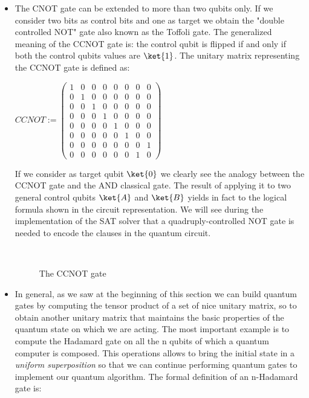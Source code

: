 \documentclass[english]{article}
\begin{document}
\begin{itemize}
				\item The CNOT gate can be extended to more than two qubits only. If we consider two bits as control bits and one as target we obtain the "double controlled NOT" gate also known as the Toffoli gate. The generalized meaning of the CCNOT gate is: the control qubit is flipped if and only if both the control qubits values are $\ket{1}$. The unitary matrix representing the CCNOT gate is defined as:
				
				\begin{center}
					$
					CCNOT :=
					\begin{pmatrix}
						1 & 0 & 0 & 0 & 0 & 0 & 0 & 0\\
						0 & 1 & 0 & 0 & 0 & 0 & 0 & 0\\
						0 & 0 & 1 & 0 & 0 & 0 & 0 & 0\\
						0 & 0 & 0 & 1 & 0 & 0 & 0 & 0\\
						0 & 0 & 0 & 0 & 1 & 0 & 0 & 0\\
						0 & 0 & 0 & 0 & 0 & 1 & 0 & 0\\
						0 & 0 & 0 & 0 & 0 & 0 & 0 & 1\\
						0 & 0 & 0 & 0 & 0 & 0 & 1 & 0
					\end{pmatrix}
					$
				\end{center}
			
				If we consider as target qubit $\ket{0}$ we clearly see the analogy between the CCNOT gate and the AND classical gate. The result of applying it to two general control qubits $\ket{A}$ and $\ket{B}$ yields in fact to the logical formula shown in the circuit representation. We will see during the implementation of the SAT solver that a quadruply-controlled NOT gate is needed to encode the clauses in the quantum circuit.
				
				\begin{figure}[h]
					\centering
					\mbox{
					}
					\caption{The CCNOT gate}
				\end{figure}
			
				\item In general, as we saw at the beginning of this section we can build quantum gates by computing the tensor product of a set of nice unitary matrix, so to obtain another unitary matrix that maintains the basic properties of the quantum state on which we are acting. The most important example is to compute the Hadamard gate on all the n qubits of which a quantum computer is composed. This operations allows to bring the initial state in a \emph{uniform superposition} so that we can continue performing quantum gates to implement our quantum algorithm. The formal definition of an n-Hadamard gate is:
				

\end{itemize}
\end{document}
